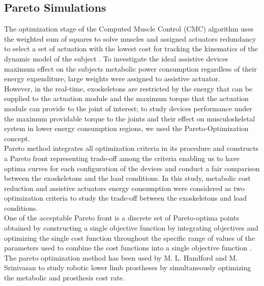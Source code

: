 \documentclass[10pt,letterpaper]{article}
\begin{document}
\subsection*{Pareto Simulations}
The optimization stage of the Computed Muscle Control (CMC) algorithm uses the weighted sum of squares to solve muscles and assigned actuators redundancy to select a set of actuation with the lowest cost for tracking the kinematics of the dynamic model of the subject \cite{92}. To investigate the ideal assistive devices maximum effect on the subjects metabolic power consumption regardless of their energy expenditure, large weights were assigned to assistive actuator.\\
However, in the real-time, exoskeletons are restricted by the energy that can be supplied to the actuation module and the maximum torque that the actuation module can provide to the joint of interest; to study devices performance under the maximum providable torque to the joints and their effect on musculoskeletal system in lower energy consumption regions, we used the Pareto-Optimization concept\cite{113}.\\
Pareto method integrates all optimization criteria in its procedure and constructs a Pareto front representing trade-off among the criteria enabling us to have optima curves for each configuration of the devices \cite{107} and conduct a fair comparison between the exoskeletons and the load conditions. In this study, metabolic cost reduction and assistive actuators energy consumption were considered as two optimization criteria to study the trade-off between the exoskeletons and load conditions.\\
One of the acceptable Pareto front is a discrete set of Pareto-optima points obtained by constructing a single objective function by integrating objectives and optimizing the single cost function throughout the specific range of values of the parameters used to combine the cost functions into a single objective function \cite{108}.\\
The pareto optimization method has been used by M. L. Handford and M. Srinivasan\cite{111,127} to study robotic lower limb prostheses by simultaneously optimizing the metabolic and prosthesis cost rate. \\
\end{document}

